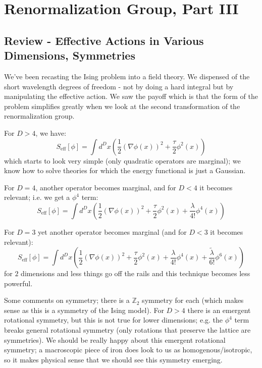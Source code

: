 \section{Renormalization Group, Part III}

\subsection{Review - Effective Actions in Various Dimensions, Symmetries}
We've been recasting the Ising problem into a field theory. We dispensed of the short wavelength degrees of freedom - not by doing a hard integral but by manipulating the effective action. We saw the payoff which is that the form of the problem simplifies greatly when we look at the second transformation of the renormalization group.

For $D > 4$, we have:
\begin{equation}
    S_{\text{eff}}[\phi] = \int d^Dx \left(\frac{1}{2}(\nabla \phi(x))^2 + \frac{\tau}{2}\phi^2(x)\right)
\end{equation}
which starts to look very simple (only quadratic operators are marginal); we know how to solve theories for which the energy functional is just a Gaussian.

For $D = 4$, another operator becomes marginal, and for $D < 4$ it becomes relevant; i.e. we get a $\phi^4$ term:
\begin{equation}
    S_{\text{eff}}[\phi] = \int d^Dx \left(\frac{1}{2}(\nabla \phi(x))^2 + \frac{\tau}{2}\phi^2(x) + \frac{\lambda}{4!}\phi^4(x)\right)
\end{equation}

For $D = 3$ yet another operator becomes marginal (and for $D < 3$ it becomes relevant):
\begin{equation}
    S_{\text{eff}}[\phi] = \int d^D x\left(\frac{1}{2}(\nabla \phi(x))^2 + \frac{\tau}{2}\phi^2(x) + \frac{\lambda}{4!}\phi^4(x) + \frac{\tilde{\lambda}}{6!}\phi^6(x)\right)
\end{equation}
for $2$ dimensions and less things go off the rails and this technique becomes less powerful.

Some comments on symmetry; there is a $\mathbb{Z}_2$ symmetry for each (which makes sense as this is a symmetry of the Ising model). For $D > 4$ there is an emergent rotational symmetry, but this is not true for lower dimensions; e.g. the $\phi^4$ term breaks general rotational symmetry (only rotations that preserve the lattice are symmetries). We should be really happy about this emergent rotational symmetry; a macroscopic piece of iron does look to us as homogenous/isotropic, so it makes physical sense that we should see this symmetry emerging.

